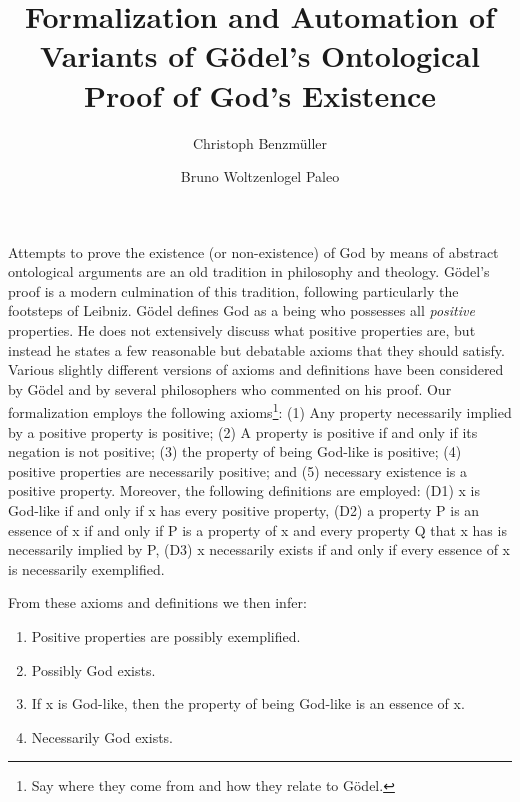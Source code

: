 \documentclass{llncs}
\title{
  Formalization and Automation of Variants of G\"{o}del's Ontological Proof of 
  God's Existence
}
\author{
  Christoph Benzm\"{u}ller\inst{1} 
  \and 
  Bruno Woltzenlogel Paleo\inst{2}
}
\institute{
  Dahlem Center for Intelligent Systems, Freie Universit\"{a}t Berlin, Germany\\
  \email{c.benzmueller@gmail.com}
  \and 
  Theory and Logic Group, Vienna University of Technology, Austria \\
  \email{bruno@logic.at}
}
\begin{document}
\maketitle

Attempts to prove the existence (or non-existence) of God by means of
abstract ontological arguments are an old tradition in philosophy and
theology.  G\"{o}del's proof \cite{Goedel} is a modern culmination of
this tradition, following particularly the footsteps of Leibniz.
%
G\"{o}del defines God as a being who possesses all \emph{positive} properties.
He does not extensively discuss what positive properties are, 
but instead he states a few reasonable but debatable axioms that they should satisfy.
Various slightly different versions of axioms and definitions have been considered by G\"{o}del and by several philosophers who commented on his proof. Our formalization employs the following axioms\footnote{Say where they come from and how they relate to G\"odel.}: (1) Any property necessarily implied by a positive property is positive;
(2) A property is positive if and only if its negation is not positive; (3) the property of being God-like is positive; (4) positive properties are necessarily positive; and (5) necessary existence is a positive property.
Moreover, the following definitions are employed:
(D1) x is God-like if and only if x has every positive property, (D2) a property P is an essence of x if and only if P is a property of x and every property Q that x has is necessarily implied by P, (D3) x necessarily exists if and only if every essence of x is necessarily exemplified.

From these axioms and definitions we then infer:
\begin{enumerate}
\item Positive properties are possibly exemplified.
\item Possibly God exists.
\item If x is God-like, then the property of being 
God-like is an essence of x.
\item Necessarily God exists.
\end{enumerate}

\end{document}
